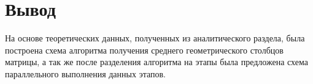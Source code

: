     
    
    \section{Вывод}
    На основе теоретических данных, полученных из аналитического раздела, была построена схема алгоритма получения среднего геометрического столбцов матрицы, а так же после разделения алгоритма на этапы была предложена схема параллельного выполнения данных этапов.
 

\newpage